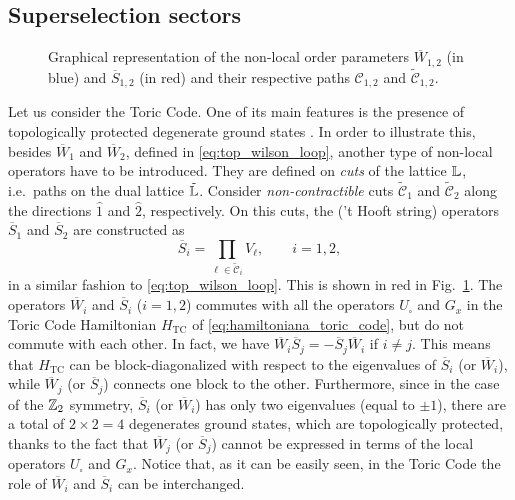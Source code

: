 \subsection{Superselection sectors}
\label{sub:superselection_sectors}



\begin{figure}[t]
    \centering
    
    \caption{Graphical representation of the non-local order parameters $\overline{W}_{1,2}$ (in blue) and $\overline{S}_{1,2}$ (in red) and their respective paths $\mathcal{C}_{1,2}$ and $\tilde{\mathcal{C}}_{1,2}$.}
    \label{fig:nonlocal_operators}
\end{figure}

Let us consider the Toric Code.
One of its main features is the presence of topologically protected degenerate ground states \cite{kitaev2003fault}.
In order to illustrate this, besides $\overline{W}_1$ and $\overline{W}_2$, defined in \eqref{eq:top_wilson_loop}, another type of non-local operators have to be introduced.
They are defined on \emph{cuts} of the lattice $\mathbb{L}$, i.e.~paths on the dual lattice $\tilde{\mathbb{L}}$.
Consider \emph{non-contractible} cuts $\tilde{\mathcal{C}}_1$ and $\tilde{\mathcal{C}}_2$ along the directions $\hat{1}$ and $\hat{2}$, respectively.
On this cuts, the ('t Hooft string) operators $\overline{S}_1$ and $\overline{S}_2$ are constructed as
\begin{equation}
    \overline{S}_i = \prod_{\ell \in \tilde{\mathcal{C}}_i} V_\ell, \qquad i=1,2,
    \label{eq:top_string_operators}
\end{equation}
in a similar fashion to \eqref{eq:top_wilson_loop}.
This is shown in red in Fig.~\ref{fig:nonlocal_operators}.
The operators $\overline{W}_i$ and $\overline{S}_i$ ($i=1,2$) commutes with all the operators $U_{\square}$ and $G_x$ in the Toric Code Hamiltonian $H_{\text{TC}}$ of \eqref{eq:hamiltoniana_toric_code}, but do not commute with each other.
In fact, we have $\overline{W}_i \overline{S}_j = - \overline{S}_j \overline{W}_i$ if $i \neq j$.
This means that $H_{\text{TC}}$ can be block-diagonalized with respect to the eigenvalues of $\overline{S}_i$ (or $\overline{W}_i$), while $\overline{W}_j$ (or $\overline{S}_j$) connects one block to the other.
Furthermore, since in the case of the  $\mathbb{Z}_2$ symmetry,
$\overline{S}_i$ (or $\overline{W}_i$) has only two eigenvalues (equal to $\pm 1$), there are a total of $2 \times 2 = 4$ degenerates ground states, which are topologically protected, thanks to the fact
that $\overline{W}_j$ (or $\overline{S}_j$) cannot be expressed in terms of the local operators $U_{\square}$ and $G_x$.
Notice that, as it can be easily seen, in the Toric Code the role of $\overline{W}_i$ and $\overline{S}_i$ can be interchanged.

